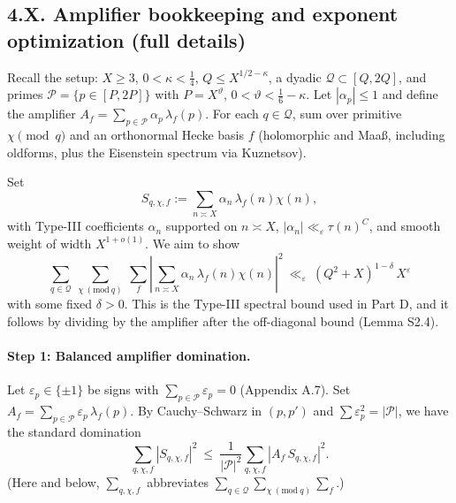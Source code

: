 \documentclass[11pt]{article}
\theoremstyle{definition}
\theoremstyle{remark}
\begin{document}
\subsection*{4.X. Amplifier bookkeeping and exponent optimization (full details)}

Recall the setup: $X\ge 3$, $0<\kappa<\tfrac14$, $Q\le X^{1/2-\kappa}$, a dyadic $\mathcal Q\subset[Q,2Q]$,
and primes $\mathcal P=\{p\in[P,2P]\}$ with $P=X^\vartheta$, $0<\vartheta<\tfrac16-\kappa$.
Let $|\alpha_p|\le 1$ and define the amplifier $A_f=\sum_{p\in\mathcal P}\alpha_p\,\lambda_f(p)$.
For each $q\in\mathcal Q$, sum over primitive $\chi\pmod q$ and an orthonormal Hecke basis $f$
(holomorphic and Maaß, including oldforms, plus the Eisenstein spectrum via Kuznetsov).

Set
\[
	S_{q,\chi,f}:=\sum_{n\asymp X}\alpha_n\,\lambda_f(n)\chi(n),
\]
with Type-III coefficients $\alpha_n$ supported on $n\asymp X$,
$|\alpha_n|\ll_\varepsilon \tau(n)^C$, and smooth weight of width $X^{1+o(1)}$.
We aim to show
\begin{equation}\label{eq:TypeIIIgoal}
	\sum_{q\in\mathcal Q}\ \sum_{\chi\ (\mathrm{mod}\ q)}\ \sum_f
	\left|\sum_{n\asymp X}\alpha_n\,\lambda_f(n)\chi(n)\right|^2
	\ \ll_\varepsilon\ (Q^2+X)^{1-\delta}\,X^{\varepsilon}
\end{equation}
with some fixed $\delta>0$. This is the Type-III spectral bound used in Part D,
and it follows by dividing by the amplifier after the off-diagonal bound (Lemma S2.4).

\paragraph{Step 1: Balanced amplifier domination.}
Let $\varepsilon_p\in\{\pm 1\}$ be signs with $\sum_{p\in\mathcal P}\varepsilon_p=0$ (Appendix A.7).
Set $A_f=\sum_{p\in\mathcal P}\varepsilon_p\,\lambda_f(p)$.
By Cauchy–Schwarz in $(p,p')$ and $\sum\varepsilon_p^2=|\mathcal P|$, we have the standard domination
\begin{equation}\label{eq:amp-dom}
	\sum_{q,\chi,f}|S_{q,\chi,f}|^2
	\ \le\ \frac{1}{|\mathcal P|^2}\sum_{q,\chi,f}|A_f\,S_{q,\chi,f}|^2.
\end{equation}
(Here and below, $\sum_{q,\chi,f}$ abbreviates $\sum_{q\in\mathcal Q}\sum_{\chi\ (\mathrm{mod}\ q)}\sum_f$.)
\end{document}
